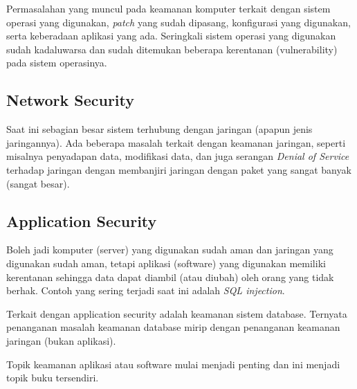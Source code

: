 Permasalahan yang muncul pada keamanan komputer terkait dengan sistem operasi
yang digunakan, {\em patch} yang sudah dipasang, konfigurasi yang digunakan,
serta keberadaan aplikasi yang ada. Seringkali sistem operasi yang digunakan
sudah kadaluwarsa dan sudah ditemukan beberapa kerentanan (vulnerability) pada
sistem operasinya.

\subsection{Network Security}
Saat ini sebagian besar sistem terhubung dengan jaringan (apapun jenis
jaringannya). Ada beberapa masalah terkait dengan keamanan jaringan, seperti
misalnya penyadapan data, modifikasi data, dan juga serangan {\em Denial of
Service} terhadap jaringan dengan membanjiri jaringan dengan paket yang sangat
banyak (sangat besar).


\subsection{Application Security}
Boleh jadi komputer (server) yang digunakan sudah aman dan jaringan yang
digunakan sudah aman, tetapi aplikasi (software) yang digunakan memiliki
kerentanan sehingga data dapat diambil (atau diubah) oleh orang yang tidak
berhak. Contoh yang sering terjadi saat ini adalah {\em SQL injection}.

Terkait dengan application security adalah keamanan sistem database.
Ternyata penanganan masalah keamanan database mirip dengan penanganan keamanan
jaringan (bukan aplikasi).

Topik keamanan aplikasi atau software mulai menjadi penting dan ini menjadi
topik buku tersendiri.
